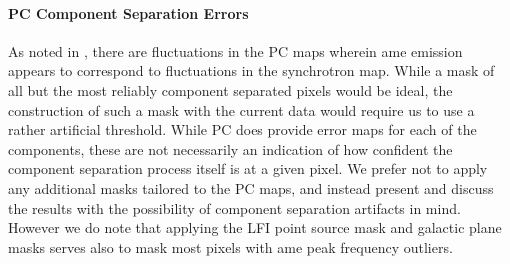       \paragraph{PC Component Separation Errors}
        As noted in \cite{planck15X, hensley16}, there are fluctuations in the PC maps wherein \acrshort{ame} emission appears to correspond to fluctuations in the synchrotron map. While a mask of all but the most reliably component separated pixels would be ideal, the construction of such a mask with the current data would require us to use a rather artificial threshold. While PC does provide error maps for each of the components, these are not necessarily an indication of how confident the component separation process itself is at a given pixel. We prefer not to apply any additional masks tailored to the PC maps, and instead present and discuss the results with the possibility of component separation artifacts in mind. However we do note that applying the LFI point source mask and galactic plane masks serves also to mask most pixels with \acrshort{ame} peak frequency outliers.

